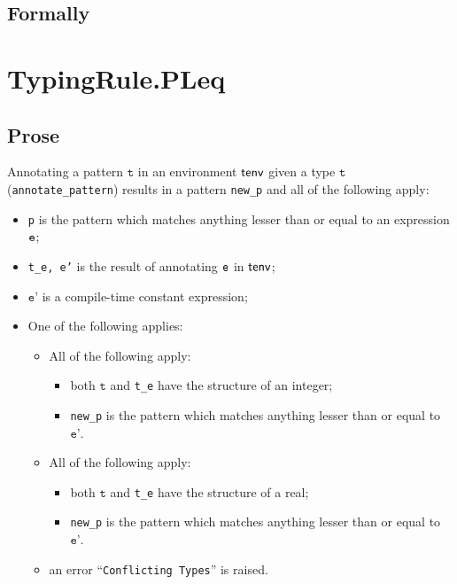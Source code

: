 \documentclass{book}
\newcommand\vt[0]{\texttt{t}}
\newcommand\vep[0]{\texttt{e'}}
\begin{document}
\begin{emptyformal}
    \subsection{Formally}
\end{emptyformal}


 \section{TypingRule.PLeq \label{sec:TypingRule.PLeq}}

  \subsection{Prose}
   Annotating a pattern $\vt$ in an environment $\textsf{tenv}$ given a type $\vt$ (\texttt{annotate\_pattern}) results in a pattern \texttt{new\_p} and all of the following apply:
   \begin{itemize}
   \item \texttt{p} is the pattern which matches anything lesser than or equal to an expression $\texttt{e}$;
   \item \texttt{t\_e, e'} is the result of annotating $\texttt{e}$ in $\textsf{tenv}$;
   \item $\vep$ is a compile-time constant expression;
   \item One of the following applies:
     \begin{itemize}
     \item All of the following apply:
           \begin{itemize}
           \item both $\vt$ and \texttt{t\_e} have the structure of an integer;
           \item \texttt{new\_p} is the pattern which matches anything lesser than or equal to $\vep$.
           \end{itemize}
     \item All of the following apply:
           \begin{itemize}
           \item both $\vt$ and \texttt{t\_e} have the structure of a real;
           \item \texttt{new\_p} is the pattern which matches anything lesser than or equal to $\vep$.
           \end{itemize}
     \item an error ``\texttt{Conflicting Types}'' is raised.
     \end{itemize}
   \end{itemize}
\end{document}
